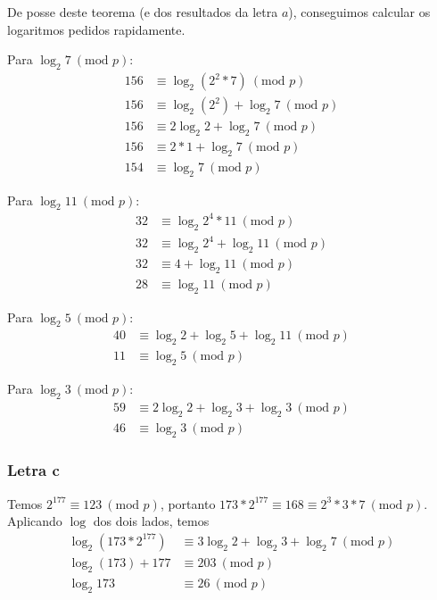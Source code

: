 \documentclass{article}
\renewcommand{\mod}[1]{ \ (\textrm{mod } #1) }
\begin{document}
De posse deste teorema (e dos resultados da letra $a$),
conseguimos calcular os logaritmos pedidos rapidamente.

Para $\log_2 7 \mod{p}$:
\begin{align*}
    156 &\equiv \log_2(2^2*7) \mod{p} \\
    156 &\equiv \log_2(2^2) + \log_2 7 \mod{p} \\
    156 &\equiv 2 \log_2 2 + \log_2 7 \mod{p} \\
    156 &\equiv 2 * 1 + \log_2 7 \mod{p} \\
    154 &\equiv \log_2 7 \mod{p}
\end{align*}

Para $\log_2 11 \mod{p}$:
\begin{align*}
    32 &\equiv \log_2 2^4*11 \mod{p} \\
    32 &\equiv \log_2 2^4 + \log_2 11 \mod{p} \\
    32 &\equiv 4 + \log_2 11 \mod{p} \\
    28 &\equiv \log_2 11 \mod{p}
\end{align*}

Para $\log_2 5 \mod{p}$:
\begin{align*}
    40 &\equiv \log_2 2 + \log_2 5 + \log_2 11 \mod{p} \\
    11 &\equiv \log_2 5 \mod{p}
\end{align*}

Para $\log_2 3 \mod{p}$:
\begin{align*}
    59 &\equiv 2\log_2 2 + \log_2 3 + \log_2 3 \mod{p} \\
    46 &\equiv \log_2 3 \mod{p}
\end{align*}

\subsubsection{Letra c}

Temos $2^{177} \equiv 123 \mod{p}$,
portanto $173*2^{177} \equiv 168 \equiv 2^3*3*7 \mod{p}$.
Aplicando $\log$ dos dois lados, temos
\begin{align*}
    \log_2(173*2^{177}) &\equiv 3\log_2 2 + \log_2 3 + \log_2 7 \mod{p} \\
    \log_2(173) + 177 &\equiv 203 \mod{p} \\
    \log_2 173 &\equiv 26 \mod{p}
\end{align*}
\end{document}
